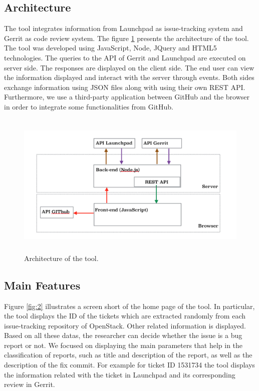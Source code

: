 \documentclass[runningheads,a4paper]{llncs}
\begin{document}
\subsection{Architecture}

The tool integrates information from Launchpad as issue-tracking system and Gerrit as code review system. The figure \ref{fig:1} presents the architecture of the tool. The tool was developed using JavaScript, Node, JQuery and HTML5 technologies. The queries to the API of Gerrit and Launchpad are executed on server side. The responses are displayed on the client side. The end user can view the information displayed and interact with the server through events. Both sides exchange information using JSON files along with using their own REST API. Furthermore, we use a third-party application between GitHub and the browser in order to integrate some functionalities from GitHub.
\label{sec:2.1}
\begin{figure}
\centering
\includegraphics[height=7cm]{Arquitectura.png}
\caption{Architecture of the tool.}
\label{fig:1}       %
\end{figure}

\subsection{Main Features}
\label{sec:2.2}
Figure \ref{fig:2} illustrates a screen short of the home page of the tool. In particular, the tool displays the ID of the tickets which are extracted randomly from each issue-tracking repository of OpenStack. Other related information is displayed. Based on all these datas, the researcher can decide whether the issue is a bug report or not. We focused on displaying the main parameters that help in the classification of reports, such as title and description of the report, as well as the description of the fix commit. For example for ticket ID 1531734 the tool displays the information related with the ticket in Launchpad and its corresponding review in Gerrit.
\end{document}
